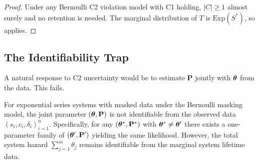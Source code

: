 \begin{proof}
Under any Bernoulli C2 violation model with C1 holding, $|C| \geq 1$
almost surely and no retention is needed. The marginal distribution of $T$
is $\mathrm{Exp}(S^*)$, so  applies.
\end{proof}

\subsection{The Identifiability Trap}
\label{sec:identifiability}

A natural response to C2 uncertainty would be to estimate $\mathbf{P}$ jointly
with $\bm{\theta}$ from the data. This fails.

\begin{theorem}
\label{thm:non-ident}
For exponential series systems with masked data under the Bernoulli masking
model, the joint parameter $(\bm{\theta}, \mathbf{P})$ is not identifiable from
the observed data $(s_i, c_i, \delta_i)_{i=1}^n$. Specifically, for any
$(\bm{\theta}^*, \mathbf{P}^*)$ with $\bm{\theta}^* \neq \bm{\theta}'$ there exists a
one-parameter family of $(\bm{\theta}', \mathbf{P}')$ yielding the same
likelihood. However, the total system hazard $\sum_{j=1}^m \theta_j$ remains
identifiable from the marginal system lifetime data.
\end{theorem}

